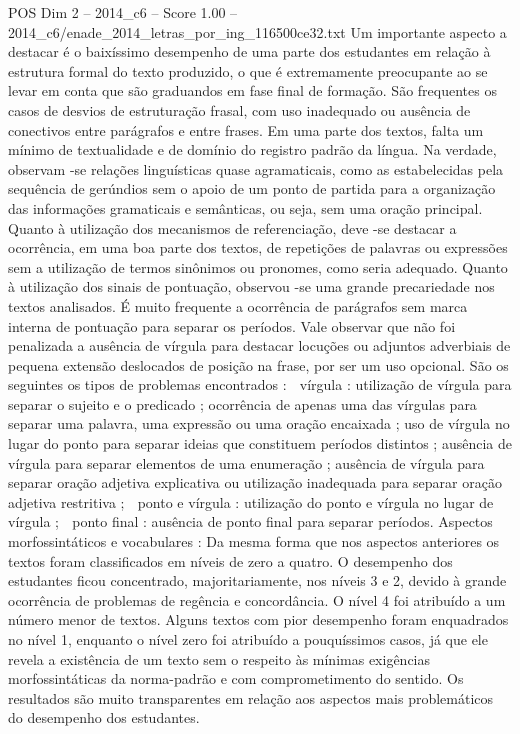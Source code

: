 \begin{textsample}{POS Dim 2 – 2014\_c6 – Score 1.00 – 2014\_c6/enade\_2014\_letras\_por\_ing\_116500ce32.txt}
Um importante aspecto a destacar é o baixíssimo desempenho de uma parte dos estudantes em relação à estrutura formal do texto produzido, o que é extremamente preocupante ao se levar em conta que são graduandos em fase final de formação.
São frequentes os casos de desvios de estruturação frasal, com uso inadequado ou ausência de conectivos entre parágrafos e entre frases.
Em uma parte dos textos, falta um mínimo de textualidade e de domínio do registro padrão da língua.
Na verdade, observam -se relações linguísticas quase agramaticais, como as estabelecidas pela sequência de gerúndios sem o apoio de um ponto de partida para a organização das informações gramaticais e semânticas, ou seja, sem uma oração principal.
Quanto à utilização dos mecanismos de referenciação, deve -se destacar a ocorrência, em uma boa parte dos textos, de repetições de palavras ou expressões sem a utilização de termos sinônimos ou pronomes, como seria adequado.
Quanto à utilização dos sinais de pontuação, observou -se uma grande precariedade nos textos analisados.
É muito frequente a ocorrência de parágrafos sem marca interna de pontuação para separar os períodos.
Vale observar que não foi penalizada a ausência de vírgula para destacar locuções ou adjuntos adverbiais de pequena extensão deslocados de posição na frase, por ser um uso opcional.
São os seguintes os tipos de problemas encontrados :  vírgula : utilização de vírgula para separar o sujeito e o predicado ; ocorrência de apenas uma das vírgulas para separar uma palavra, uma expressão ou uma oração encaixada ; uso de vírgula no lugar do ponto para separar ideias que constituem períodos distintos ; ausência de vírgula para separar elementos de uma enumeração ; ausência de vírgula para separar oração adjetiva explicativa ou utilização inadequada para separar oração adjetiva restritiva ;  ponto e vírgula : utilização do ponto e vírgula no lugar de vírgula ;  ponto final : ausência de ponto final para separar períodos.
Aspectos morfossintáticos e vocabulares : Da mesma forma que nos aspectos anteriores os textos foram classificados em níveis de zero a quatro.
O desempenho dos estudantes ficou concentrado, majoritariamente, nos níveis 3 e 2, devido à grande ocorrência de problemas de regência e concordância.
O nível 4 foi atribuído a um número menor de textos.
Alguns textos com pior desempenho foram enquadrados no nível 1, enquanto o nível zero foi atribuído a pouquíssimos casos, já que ele revela a existência de um texto sem o respeito às mínimas exigências morfossintáticas da norma-padrão e com comprometimento do sentido.
Os resultados são muito transparentes em relação aos aspectos mais problemáticos do desempenho dos estudantes.

\end{textsample}
